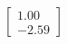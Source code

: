 \documentclass[preview]{standalone}
\begin{document}
\begin{align*}
\begin{bmatrix} 1.00 \\ -2.59 \end{bmatrix}
\end{align*}
\end{document}
